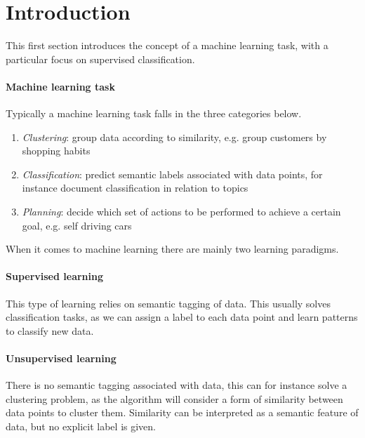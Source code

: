 \section{Introduction}

This first section introduces the concept of a machine learning task, with a particular
focus on supervised classification. 

\paragraph{Machine learning task}
Typically a machine learning task falls in the three categories below.
\begin{enumerate}
    \item \emph{Clustering}: group data according to similarity, e.g. group customers by 
    shopping habits
    \item \emph{Classification}: predict semantic labels associated with data points, 
    for instance document classification in relation to topics
    \item \emph{Planning}: decide which set of actions to be performed to achieve a 
    certain goal, e.g. self driving cars
\end{enumerate}

When it comes to machine learning there are mainly two learning paradigms.

\paragraph{Supervised learning}
This type of learning relies on semantic tagging of data.
This usually solves classification tasks, as we can assign a label to each data point 
and learn patterns to classify new data.

\paragraph{Unsupervised learning}
There is no semantic tagging associated with data, this can for instance solve a clustering 
problem, as the algorithm will consider a form of similarity between data points 
to cluster them. 
Similarity can be interpreted as a semantic feature of data, but no explicit label is given.